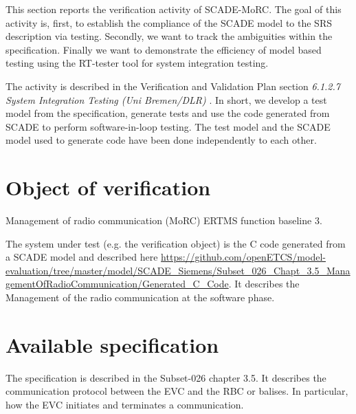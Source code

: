 
\newcommand{\tbi}[1]{$<$\textit{#1}$>$}

\newcommand{\nl}{\mbox{}\\}
\newcommand{\nlskip}[1]{\mbox{}\\[#1]}

%
\newcommand{\cmmnt}[1]{\framebox{#1}}
\newcommand{\bgcmmnt}[1]{\nl\framebox{\parbox{.95\textwidth}{#1}}\nl[2mm]}
%

\newcommand{\eod}{\nl\rule{.95\textwidth}{1pt}\nl\textit{End of Document}}


\label{sec:ubremen}
This section reports the verification activity of SCADE-MoRC. The goal
of this activity is, first, to establish the compliance of the SCADE
model to the SRS description via testing. Secondly, we want to track
the ambiguities within the specification. Finally we want to
demonstrate the efficiency of model based testing using the RT-tester
tool for system integration testing.

The activity is described in the Verification and Validation Plan
section {\em 6.1.2.7 System Integration Testing (Uni Bremen/DLR)} \cite{D4.1_2013}.
In short, we develop a test model from the specification, generate tests and use
the code generated from SCADE to perform software-in-loop testing.
The test model and the SCADE model used to generate code have been
done independently to each other. 

\section{Object of verification}
 Management of radio communication (MoRC) ERTMS function baseline 3.


The system under test (e.g. the verification object) is the C code
generated from a SCADE model and described here
\url{https://github.com/openETCS/model-evaluation/tree/master/model/SCADE_Siemens/Subset_026_Chapt_3.5_ManagementOfRadioCommunication/Generated_C_Code}.
It describes the Management of the radio communication at the software
phase.




\section{Available specification}

The specification is described in the
Subset-026 chapter 3.5. It
describes the communication protocol between the EVC and the RBC or
balises. In particular, how the EVC initiates and terminates a
communication.



